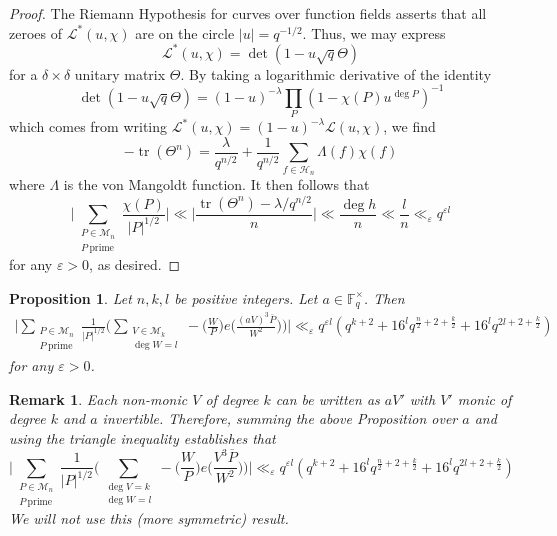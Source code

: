 \documentclass[12pt,reqno]{amsart}
\newcommand{\CL}{\mathcal{L}}
\newcommand{\CM}{\mathcal{M}}
\newcommand{\CH}{\mathcal{H}}
\DeclareMathOperator{\tr}{tr}
\newtheorem{prop}[lem]{Proposition}
\newtheorem{rem}[lem]{Remark}
\begin{document}
\begin{proof}
    The Riemann Hypothesis for curves over function fields \cite{Weil} asserts that all zeroes of $\CL^{*}(u,\chi)$ are on the circle $|u|=q^{-1/2}$. %
    Thus, we may express
    $$
    \CL^{*}(u,\chi) = \det ( 1-u\sqrt{q} \Theta )
    $$
for a $\delta \times \delta$ unitary matrix  $\Theta$. By taking a logarithmic derivative of the identity
$$
\det ( 1-u\sqrt{q} \Theta ) = (1-u)^{-\lambda} \prod_{P} (1-\chi(P)u^{\deg P})^{-1}
$$
which comes from writing $\CL^{*}(u,\chi) = (1-u)^{-\lambda}\CL(u,\chi)$, we find
$$
-\tr(\Theta^n) = \frac{\lambda}{q^{n/2}} + \frac{1}{q^{n/2}} \sum\limits_{f \in \CH_{n}} \Lambda(f)\chi(f)
$$
where $\Lambda$ is the von Mangoldt function. It then follows that
$$
 \Big | \sum_{\substack{P \in \CM_{n} \\ P \ \text{prime} }} \frac{\chi(P) }{|P|^{1/2}} \Big | \ll \Big | \frac{\tr (\Theta^{n}) -  \lambda/q^{n/2} } {n} \Big | \ll \frac{\deg h}{n} \ll \frac{l}{n} \ll_{\varepsilon} q^{\varepsilon l}
$$
for any $\varepsilon > 0$, as desired.
\end{proof}


\begin{prop}\label{mainbound}
    Let $n,k,l$ be positive integers. Let $a \in \mathbb{F}_q^{\times}$. Then
    \begin{align*}
      \Big |  \sum_{\substack{P \in \CM_{n} \\ P \ \text{prime}}} \frac{1}{|P|^{1/2}} \Big (\sum_{\substack{V \in \mathcal{M}_k \\ \deg W =l}} - \Big (\frac{W}{P} \Big ) e\Big ( \frac{(a V)^3\overline{P}}{W^2} \Big ) \Big) \Big | \ll_\varepsilon q^{\varepsilon l } ( q^{k+2}+ 16^{l} q^{\frac{n}{2} + 2 + \frac{k}{2}} + 16^{l} q^{2l + 2+ \frac{k}{2}}  )     
    \end{align*} 
for any $\varepsilon>0$.
\end{prop}
\begin{rem}
Each non-monic $V$ of degree $k$ can be written as $a V'$ with $V'$ monic of degree $k$ and $a$ invertible. Therefore, summing the above Proposition over $a$ and using the triangle inequality establishes that
$$
\Big |  \sum_{\substack{P \in \CM_{n} \\ P \ \text{prime}}} \frac{1}{|P|^{1/2}} \Big (\sum_{\substack{\deg V =k \\ \deg W =l}} - \Big (\frac{W}{P} \Big ) e\Big ( \frac{V^3\overline{P}}{W^2} \Big ) \Big) \Big | \ll_\varepsilon q^{\varepsilon l } ( q^{k+2}+ 16^{l} q^{\frac{n}{2} + 2 + \frac{k}{2}} + 16^{l} q^{2l + 2+ \frac{k}{2}}  )
$$
We will not use this (more symmetric) result. 
\end{rem}
\end{document}
